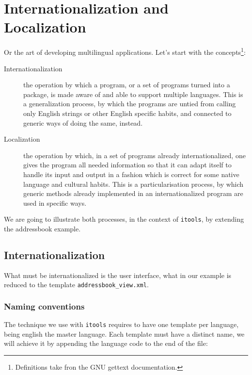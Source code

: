 \chapter{Internationalization and Localization}
\label{Chapter: i18n}

Or the art of developing multilingual applications. Let's start with the
concepts\footnote{Definitions take fron the GNU gettext documentation.}:

\begin{description}
  \item [Internationalization] the operation by which a program, or a set
    of programs turned into a package, is made aware of and able to support
    multiple languages. This is a generalization process, by which the
    programs are untied from calling only English strings or other English
    specific habits, and connected to generic ways of doing the same, instead.

  \item [Localization] the operation by which, in a set of programs already
    internationalized, one gives the program all needed information so that
    it can adapt itself to handle its input and output in a fashion which is
    correct for some native language and cultural habits. This is a
    particularisation process, by which generic methods already implemented
    in an internationalized program are used in specific ways. 
\end{description}

We are going to illustrate both processes, in the context of {\tt itools},
by extending the addressbook example.


\section{Internationalization}

What must be internationalized is the user interface, what in our example
is reduced to the template {\tt addressbook\_view.xml}.

\subsection{Naming conventions}

The technique we use with {\tt itools} requires to have one template per
language, being english the master language. Each template must have a
distinct name, we will achieve it by appending the language code to the
end of the file:

